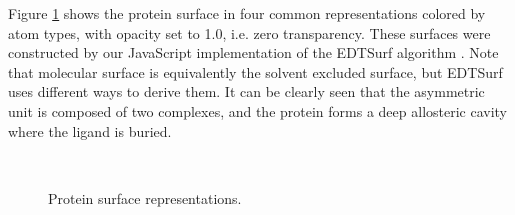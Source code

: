 Figure \ref{iview:surface} shows the protein surface in four common representations colored by atom types, with opacity set to 1.0, i.e. zero transparency. These surfaces were constructed by our JavaScript implementation of the EDTSurf algorithm \citep{1297,1350}. Note that molecular surface is equivalently the solvent excluded surface, but EDTSurf uses different ways to derive them. It can be clearly seen that the asymmetric unit is composed of two complexes, and the protein forms a deep allosteric cavity where the ligand is buried.

\begin{figure}
\centering
{}
\\
\caption{Protein surface representations.}
\label{iview:surface}
\end{figure}

